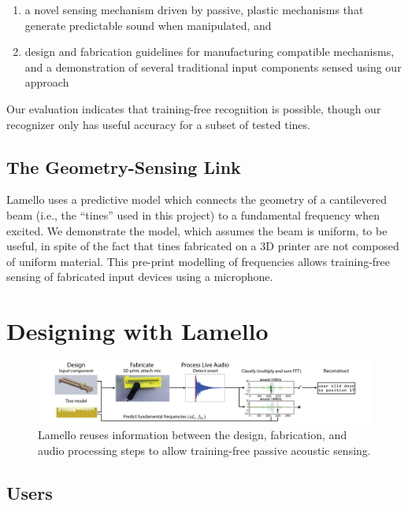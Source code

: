 \begin{enumerate}
\item a novel sensing mechanism driven by passive, plastic mechanisms that generate predictable sound when manipulated, and
\item design and fabrication guidelines for manufacturing compatible mechanisms, and a demonstration of several traditional input components sensed using our approach
\end{enumerate}

Our evaluation indicates that training-free recognition is possible, though our recognizer only has useful accuracy for a subset of tested tines.

    \subsection{The Geometry-Sensing Link}
    Lamello uses a predictive model which connects the geometry of a cantilevered beam (i.e., the ``tines'' used in this project) to a fundamental frequency when excited. We demonstrate the model, which assumes the beam is uniform, to be useful, in spite of the fact that tines fabricated on a 3D printer are not composed of uniform material. This pre-print modelling of frequencies allows training-free sensing of fabricated input devices using a microphone.
    
\section{Designing with Lamello}

\begin{figure}[t]
  \centering
    \includegraphics[width=\textwidth]{figures/lamello/systemdiagram-bh.png}
  \caption{Lamello reuses information between the design, fabrication, and audio processing steps to allow training-free passive acoustic sensing.}
  \label{fig:lamello-system}
  \vspace{-0.1in}
\end{figure}

    \subsection{Users}
    
